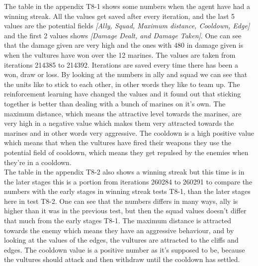 

The table in the appendix T8-1 shows some numbers when the agent have had a winning streak. All the values get saved after every iteration, and the last 5 values are the potential fields \textit{[Ally, Squad, Maximum distance, Cooldown, Edge]} and the first 2 values shows \textit{[Damage Dealt, and Damage Taken]}. One can see that the damage given are very high and the ones with 480 in damage given is when the vultures have won over the 12 marines. The values are taken from iterations 214385 to 214392. Iterations are saved every time there has been a won, draw or loss. By looking at the numbers in ally and squad we can see that the units like to stick to each other, in other words they like to team up. The reinforcement learning have changed the values and it found out that sticking together is better than dealing with a bunch of marines on it's own. The maximum distance, which means the attractive level towards the marines, are very high in a negative value which makes them very attracted towards the marines and in other words very aggressive. The cooldown is a high positive value which means that when the vultures have fired their weapons they use the potential field of cooldown, which means they get repulsed by the enemies when they're in a cooldown. \\






The table in the appendix T8-2 also shows a winning streak but this time is in the later stages this is a portion from iterations 260284 to 260291 to compare the numbers with the early stages in winning streak tests T8-1, than the later stages here in test T8-2. One can see that the numbers differs in many ways, ally is higher than it was in the previous test, but then the squad values doesn't differ that much from the early stages T8-1. The maximum distance is attracted towards the enemy which means they have an aggressive behaviour, and by looking at the values of the edges, the vultures are attracted to the cliffs and edges. The cooldown value is a positive number as it's supposed to be, because the vultures should attack and then withdraw until the cooldown has settled.

